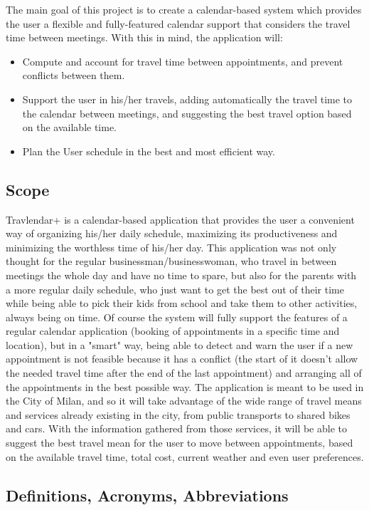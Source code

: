 \documentclass[12pt]{article}
\begin{document}
The main goal of this project is to create a calendar-based system which provides the user a flexible and fully-featured calendar support that considers the travel time between meetings. With this in mind, the application will:
\begin{itemize}
\item Compute and account for travel time between appointments, and prevent conflicts between them.
\item Support the user in his/her travels, adding automatically the travel time to the calendar between meetings, and suggesting the best travel option based on the available time.
\item Plan the User schedule in the best and most efficient way.
\end{itemize}

\subsection{Scope}
Travlendar+ is a calendar-based application that provides the user a convenient way of organizing his/her daily schedule, maximizing its productiveness and minimizing the worthless time of his/her day. This application was not only thought for the regular businessman/businesswoman, who travel in between meetings the whole day and have no time to spare, but also for the parents with a more regular daily schedule, who just want to get the best out of their time while being able to pick their kids from school and take them to other activities, always being on time.
Of course the system will fully support the features of a regular calendar application (booking of appointments in a specific time and location), but in a "smart" way, being able to detect and warn the user if a new appointment is not feasible because it has a conflict (the start of it doesn't allow the needed travel time after the end of the last appointment) and arranging all of the appointments in the best possible way. The application is meant to be used in the City of Milan, and so it will take advantage of the wide range of travel means and services already existing in the city, from public transports to shared bikes and cars. With the information gathered from those services, it will be able to suggest the best travel mean for the user to move between appointments, based on the available travel time, total cost, current weather and even user preferences.


\subsection{Definitions, Acronyms, Abbreviations}
\end{document}
